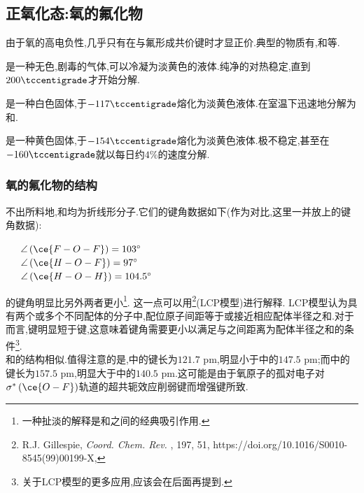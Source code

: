\documentclass{ctexart}
\begin{document}
\subsection{正氧化态:氧的氟化物}
由于氧的高电负性,几乎只有在与氟形成共价键时才显正价.典型的物质有,和等.
\begin{substance}[\ce{OF2}]
    是一种无色,剧毒的气体,可以冷凝为淡黄色的液体.纯净的对热稳定,直到$200\tccentigrade$才开始分解.
\end{substance}
\begin{substance}[\ce{HOF}]
    是一种白色固体,于$-117\tccentigrade$熔化为淡黄色液体.在室温下迅速地分解为和.
\end{substance}
\begin{substance}[\ce{O2F2}]
    是一种黄色固体,于$-154\tccentigrade$熔化为淡黄色液体.极不稳定,甚至在$-160\tccentigrade$就以每日约$4\%$的速度分解.
\end{substance}
\subsubsection{氧的氟化物的结构} 不出所料地,和均为折线形分子.它们的键角数据如下(作为对比,这里一并放上的键角数据):
\begin{center}
    \ \ \ $\angle\left(\ce{F-O-F}\right)=103^\circ$\\
    \ \ \ $\angle\left(\ce{H-O-F}\right)=97^\circ$\\
    \ \ \ $\angle\left(\ce{H-O-H}\right)=104.5^\circ$
\end{center}

\indent {}的键角明显比另外两者更小\footnote{一种扯淡的解释是和之间的经典吸引作用.}.%
这一点可以用\footnote{R.J. Gillespie, \textit{Coord. Chem. Rev.} , 197, 51, https://doi.org/10.1016/S0010-8545(99)00199-X,}(LCP模型)进行解释.%
LCP模型认为具有两个或多个不同配体的分子中,配位原子间距等于或接近相应配体半径之和.对于而言,键明显短于键,这意味着键角需要更小以满足与之间距离为配体半径之和的条件\footnote{关于LCP模型的更多应用,应该会在后面再提到.}.\\
\indent {}和的结构相似.值得注意的是,中的键长为$121.7\text{ pm}$,明显小于中的$147.5\text{ pm}$;而中的键长为$157.5\text{ pm}$,明显大于中的$140.5\text{ pm}$.这可能是由于氧原子的孤对电子对$\sigma^\ast\left(\ce{O-F}\right)$轨道的超共轭效应削弱键而增强键所致.
\end{document}
